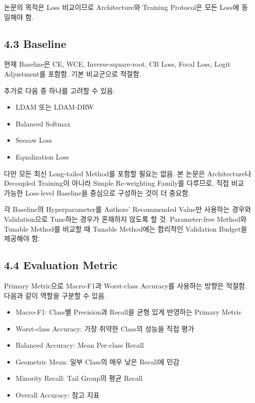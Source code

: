 \documentclass[11pt,a4paper]{article}
\begin{document}
논문의 목적은 Loss 비교이므로 Architecture와 Training Protocol은 모든 Loss에 동일해야 함.

\subsection{4.3 Baseline}

현재 Baseline은 CE, WCE, Inverse-square-root, CB Loss, Focal Loss, Logit Adjustment를 포함함. 기본 비교군으로 적절함.

추가로 다음 중 하나를 고려할 수 있음.

\begin{itemize}
\item LDAM 또는 LDAM-DRW
\item Balanced Softmax
\item Seesaw Loss
\item Equalization Loss
\end{itemize}

다만 모든 최신 Long-tailed Method를 포함할 필요는 없음. 본 논문은 Architecture나 Decoupled Training이 아니라 Simple Re-weighting Family를 다루므로, 직접 비교 가능한 Loss-level Baseline을 중심으로 구성하는 것이 더 중요함.

\begin{tcolorbox}[title=Baseline 공정성]
각 Baseline의 Hyperparameter를 Authors' Recommended Value만 사용하는 경우와 Validation으로 Tune하는 경우가 혼재하지 않도록 할 것. Parameter-free Method와 Tunable Method를 비교할 때 Tunable Method에는 합리적인 Validation Budget을 제공해야 함.
\end{tcolorbox}

\subsection{4.4 Evaluation Metric}

Primary Metric으로 Macro-F1과 Worst-class Accuracy를 사용하는 방향은 적절함. 다음과 같이 역할을 구분할 수 있음.

\begin{itemize}
\item Macro-F1: Class별 Precision과 Recall을 균형 있게 반영하는 Primary Metric
\item Worst-class Accuracy: 가장 취약한 Class의 성능을 직접 평가
\item Balanced Accuracy: Mean Per-class Recall
\item Geometric Mean: 일부 Class의 매우 낮은 Recall에 민감
\item Minority Recall: Tail Group의 평균 Recall
\item Overall Accuracy: 참고 지표
\end{itemize}
\end{document}
